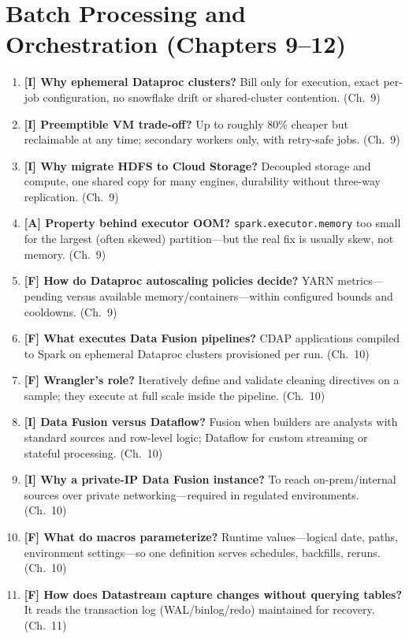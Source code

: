 \section{Batch Processing and Orchestration (Chapters 9--12)}
\begin{enumerate}
    \item \textbf{[I] Why ephemeral Dataproc clusters?} Bill only for execution, exact per-job
    configuration, no snowflake drift or shared-cluster contention. (Ch.~9)
    \item \textbf{[I] Preemptible VM trade-off?} Up to roughly 80\% cheaper but reclaimable at any
    time; secondary workers only, with retry-safe jobs. (Ch.~9)
    \item \textbf{[I] Why migrate HDFS to Cloud Storage?} Decoupled storage and compute, one
    shared copy for many engines, durability without three-way replication. (Ch.~9)
    \item \textbf{[A] Property behind executor OOM?} \texttt{spark.executor.memory} too small for
    the largest (often skewed) partition---but the real fix is usually skew, not memory. (Ch.~9)
    \item \textbf{[F] How do Dataproc autoscaling policies decide?} YARN metrics---pending versus
    available memory/containers---within configured bounds and cooldowns. (Ch.~9)
    \item \textbf{[F] What executes Data Fusion pipelines?} CDAP applications compiled to Spark on
    ephemeral Dataproc clusters provisioned per run. (Ch.~10)
    \item \textbf{[F] Wrangler's role?} Iteratively define and validate cleaning directives on a
    sample; they execute at full scale inside the pipeline. (Ch.~10)
    \item \textbf{[I] Data Fusion versus Dataflow?} Fusion when builders are analysts with
    standard sources and row-level logic; Dataflow for custom streaming or stateful processing.
    (Ch.~10)
    \item \textbf{[I] Why a private-IP Data Fusion instance?} To reach on-prem/internal sources
    over private networking---required in regulated environments. (Ch.~10)
    \item \textbf{[F] What do macros parameterize?} Runtime values---logical date, paths,
    environment settings---so one definition serves schedules, backfills, reruns. (Ch.~10)
    \item \textbf{[F] How does Datastream capture changes without querying tables?} It reads the
    transaction log (WAL/binlog/redo) maintained for recovery. (Ch.~11)

\end{enumerate}
